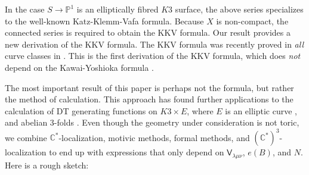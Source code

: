\documentclass{amsart}
\theoremstyle{definition}
\newcommand{\CC} {\mathbb{C}}          %
\newcommand{\PP} {\mathbb{P}}
\newcommand{\sfV}{\mathsf{V}}
\begin{document}
In the case $S \rightarrow \PP^1$ is an elliptically fibred $K3$
surface, the above series specializes to the well-known
Katz-Klemm-Vafa formula. Because $X$ is non-compact, the connected
series is required to obtain the KKV formula. Our result provides a
new derivation of the KKV formula. The KKV formula was recently proved
in \emph{all} curve classes in \cite{PT}. This is the first derivation
of the KKV formula, which does \emph{not} depend on the Kawai-Yoshioka
formula \cite{KY}.

The most important result of this paper is perhaps not the formula,
but rather the method of calculation. This approach has found further
applications to the calculation of DT generating functions on $K3
\times E$, where $E$ is an elliptic curve \cite{Bry}, and abelian
3-folds \cite{BOPY}. Even though the geometry under consideration is
not toric, we combine $\CC^*$-localization, motivic methods, formal
methods, and $(\CC^{*})^{3}$-localization to end up with expressions
that only depend on $\sfV_{\lambda\mu\nu}$, $e(B)$, and $N$. Here is a
rough sketch:
\end{document}
